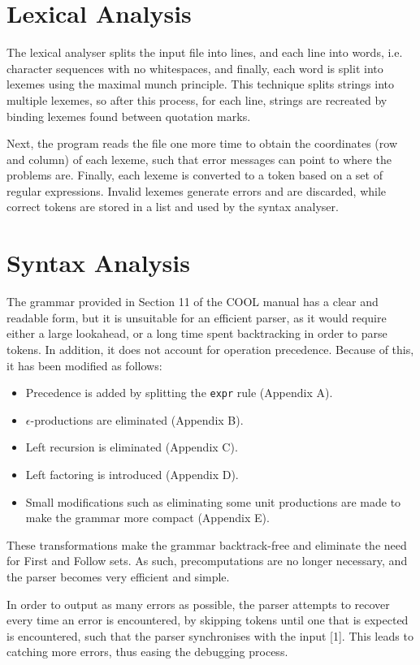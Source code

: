 \documentclass[10pt,a4paper,twocolumn]{article}
\begin{document}
\section*{Lexical Analysis}
The lexical analyser splits the input file into lines, and each line into words, i.e. character sequences with no whitespaces, and finally, each word is split into lexemes using the maximal munch principle. This technique splits strings into multiple lexemes, so after this process, for each line, strings are recreated by binding lexemes found between quotation marks.

Next, the program reads the file one more time to obtain the coordinates (row and column) of each lexeme, such that error messages can point to where the problems are. Finally, each lexeme is converted to a token based on a set of regular expressions. Invalid lexemes generate errors and are discarded, while correct tokens are stored in a list and used by the syntax analyser.

\section*{Syntax Analysis}
The grammar provided in Section 11 of the COOL manual has a clear and readable form, but it is unsuitable for an efficient parser, as it would require either a large lookahead, or a long time spent backtracking in order to parse tokens. In addition, it does not account for operation precedence. Because of this, it has been modified as follows: 
\begin{itemize}
\item Precedence is added by splitting the \texttt{expr} rule (Appendix A).
\item $\epsilon$-productions are eliminated (Appendix B).
\item Left recursion is eliminated (Appendix C).
\item Left factoring is introduced (Appendix D).
\item Small modifications such as eliminating some unit productions are made to make the grammar more compact (Appendix E).
\end{itemize}

These transformations make the grammar backtrack-free and eliminate the need for First and Follow sets. As such, precomputations are no longer necessary, and the parser becomes very efficient and simple.

In order to output as many errors as possible, the parser attempts to recover every time an error is encountered, by skipping tokens until one that is expected is encountered, such that the parser synchronises with the input [1]. This leads to catching more errors, thus easing the debugging process.
\end{document}
